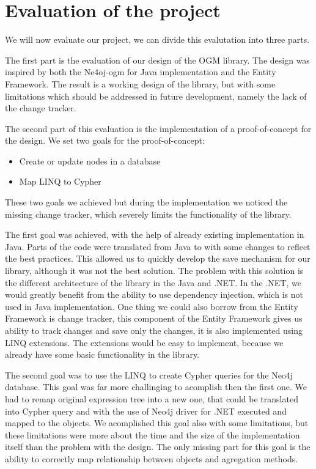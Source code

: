 \chapter{Evaluation of the project}

We will now evaluate our project, we can divide this evalutation into three parts.

The first part is the evaluation of our design of the OGM library. The design was inspired by both the Ne4oj-\acrshort{ogm} for Java implementation and the Entity Framework.
The result is a working design of the library, but with some limitations which should be addressed in future development, namely the lack of the change tracker.

The second part of this evaluation is the implementation of a proof-of-concept for the design.
We set two goals for the proof-of-concept:
\begin{itemize}
    \item {Create or update nodes in a database}
    \item {Map LINQ to Cypher}
\end{itemize}
These two goals we achieved but during the implementation we noticed the missing change tracker, which severely limits the functionality of the library.

The first goal was achieved, with the help of already existing implementation in Java. Parts of the code were translated from Java to \CS with some changes to reflect the best practices.
This allowed us to quickly develop the save mechanism for our library, although it was not the best solution.
The problem with this solution is the different architecture of the library in the Java and .NET.
In the .NET, we would greatly benefit from the ability to use dependency injection, which is not used in Java implementation.
One thing we could also borrow from the Entity Framework is change tracker, this component of the Entity Framework gives us ability to track changes and save only the changes, it is also implemented using LINQ extensions.
The extensions would be easy to implement, because we already have some basic functionality in the library.

The second goal was to use the LINQ to create Cypher queries for the Neo4j database.
This goal was far more challinging to acomplish then the first one.
We had to remap original expression tree into a new one, that could be translated into Cypher query and with the use of Neo4j driver for .NET executed and mapped to the objects.
We acomplished this goal also with some limitations, but these limitations were more about the time and the size of the implementation itself than the problem with the design.
The only missing part for this goal is the ability to correctly map relationship between objects and agregation methods.


